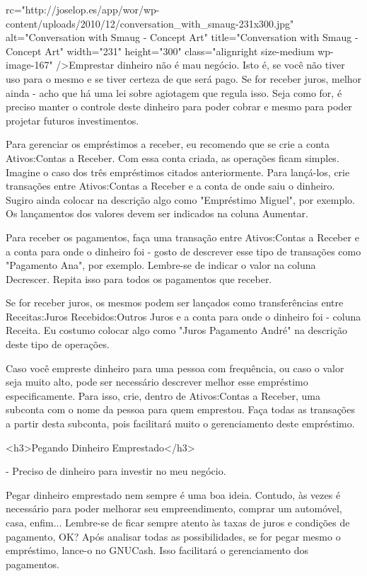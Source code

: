 rc="http://joselop.es/app/wor/wp-content/uploads/2010/12/conversation_with_smaug-231x300.jpg" alt="Conversation with Smaug - Concept Art" title="Conversation with Smaug - Concept Art" width="231" height="300" class="alignright size-medium wp-image-167" />Emprestar dinheiro não é mau negócio. Isto é, se você não tiver uso para o mesmo e se tiver certeza de que será pago. Se for receber juros, melhor ainda - acho que há uma lei sobre agiotagem que regula isso. Seja como for, é preciso manter o controle deste dinheiro para poder cobrar e mesmo para poder projetar futuros investimentos.

Para gerenciar os empréstimos a receber, eu recomendo que se crie a conta Ativos:Contas a Receber. Com essa conta criada, as operações ficam simples. Imagine o caso dos três empréstimos citados anteriormente. Para lançá-los, crie transações entre Ativos:Contas a Receber e a conta de onde saiu o dinheiro. Sugiro ainda colocar na descrição algo como "Empréstimo Miguel", por exemplo. Os lançamentos dos valores devem ser indicados na coluna Aumentar.

Para receber os pagamentos, faça uma transação entre Ativos:Contas a Receber e a conta para onde o dinheiro foi - gosto de descrever esse tipo de transações como "Pagamento Ana", por exemplo. Lembre-se de indicar o valor na coluna Decrescer. Repita isso para todos os pagamentos que receber.

Se for receber juros, os mesmos podem ser lançados como transferências entre Receitas:Juros Recebidos:Outros Juros e a conta para onde o dinheiro foi - coluna Receita. Eu costumo colocar algo como "Juros Pagamento André" na descrição deste tipo de operações.

Caso você empreste dinheiro para uma pessoa com frequência, ou caso o valor seja muito alto, pode ser necessário descrever melhor esse empréstimo especificamente. Para isso, crie, dentro de Ativos:Contas a Receber, uma subconta com o nome da pessoa para quem emprestou. Faça todas as transações a partir desta subconta, pois facilitará muito o gerenciamento deste empréstimo.

<h3>Pegando Dinheiro Emprestado</h3>

- Preciso de dinheiro para investir no meu negócio.

Pegar dinheiro emprestado nem sempre é uma boa ideia. Contudo, às vezes é necessário para poder melhorar seu empreendimento, comprar um automóvel, casa, enfim... Lembre-se de ficar sempre atento às taxas de juros e condições de pagamento, OK? Após analisar todas as possibilidades, se for pegar mesmo o empréstimo, lance-o no GNUCash. Isso facilitará o gerenciamento dos pagamentos.

